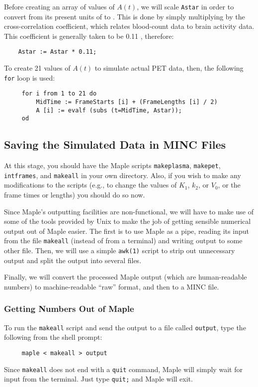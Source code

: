 Before creating an array of values of $A(t)$, we will scale
\verb|Astar| in order to convert from its present units of
 to .  This
is done by simply multiplying by the cross-correlation coefficient,
which relates blood-count data to brain activity data.  This
coefficient is generally taken to be 0.11 , therefore:
\begin{verbatim}
    Astar := Astar * 0.11;
\end{verbatim}

To create 21 values of $A(t)$ to simulate actual PET data, then, the
following \verb|for| loop is used:
\begin{verbatim}
     for i from 1 to 21 do
         MidTime := FrameStarts [i] + (FrameLengths [i] / 2)
         A [i] := evalf (subs (t=MidTime, Astar));
     od
\end{verbatim}

\subsection{Saving the Simulated Data in MINC Files}

At this stage, you should have the Maple scripts \verb|makeplasma|,
\verb|makepet|, \verb|intframes|, and \verb|makeall| in your own
directory.  Also, if you wish to make any modifications to the scripts
(e.g., to change the values of $K_1$, $k_2$, or $V_0$, or the frame
times or lengths) you should do so now.

Since Maple's outputting facilities are non-functional, we will have
to make use of some of the tools provided by Unix to make the job of
getting sensible numerical output out of Maple easier.  The first is
to use Maple as a pipe, reading its input from the file \verb|makeall|
(instead of from a terminal) and writing output to some other file.
Then, we will use a simple \verb|awk(1)| script to strip out
unnecessary output and split the output into several files.

Finally, we will convert the processed Maple output (which are
human-readable numbers) to machine-readable ``raw'' format, and then
to a MINC file.

\subsubsection{Getting Numbers Out of Maple}

To run the \verb|makeall| script and send the output to a file called
\verb|output|, type the following from the shell prompt:
\begin{verbatim}
     maple < makeall > output 
\end{verbatim}
Since \verb|makeall| does not end with a \verb|quit| command, Maple
will simply wait for input from the terminal.  Just type \verb|quit;|
and Maple will exit.

